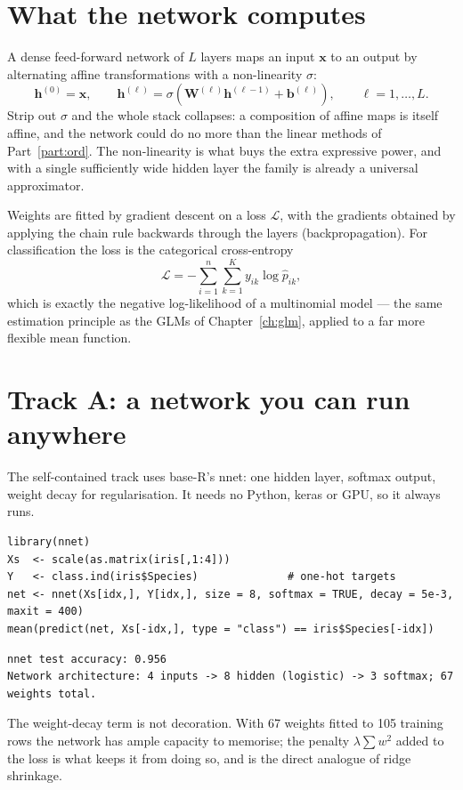 \documentclass[11pt,oneside]{book}
\newcommand{\R}{\textsf{R}}
\newcommand{\pkg}[1]{\textsf{#1}}
\begin{document}
\section{What the network computes}
A dense feed-forward network of $L$ layers maps an input $\mathbf{x}$ to an output by
alternating affine transformations with a non-linearity $\sigma$:
\[
  \mathbf{h}^{(0)}=\mathbf{x},\qquad
  \mathbf{h}^{(\ell)}=\sigma\!\left(\mathbf{W}^{(\ell)}\mathbf{h}^{(\ell-1)}+\mathbf{b}^{(\ell)}\right),
  \qquad \ell=1,\dots,L .
\]
Strip out $\sigma$ and the whole stack collapses: a composition of affine maps is itself
affine, and the network could do no more than the linear methods of Part~\ref{part:ord}. The
non-linearity is what buys the extra expressive power, and with a single sufficiently wide
hidden layer the family is already a universal approximator.

Weights are fitted by gradient descent on a loss $\mathcal{L}$, with the gradients obtained
by applying the chain rule backwards through the layers (backpropagation). For
classification the loss is the categorical cross-entropy
\[
  \mathcal{L}=-\sum_{i=1}^{n}\sum_{k=1}^{K} y_{ik}\log \hat{p}_{ik},
\]
which is exactly the negative log-likelihood of a multinomial model — the same estimation
principle as the GLMs of Chapter~\ref{ch:glm}, applied to a far more flexible mean function.

\section{Track A: a network you can run anywhere}
The self-contained track uses base-\R's \pkg{nnet}: one hidden layer, softmax output,
weight decay for regularisation. It needs no Python, keras or GPU, so it always runs.

\begin{lstlisting}
library(nnet)
Xs  <- scale(as.matrix(iris[,1:4]))
Y   <- class.ind(iris$Species)              # one-hot targets
net <- nnet(Xs[idx,], Y[idx,], size = 8, softmax = TRUE, decay = 5e-3, maxit = 400)
mean(predict(net, Xs[-idx,], type = "class") == iris$Species[-idx])
\end{lstlisting}

\begin{lstlisting}[style=rout]
nnet test accuracy: 0.956
Network architecture: 4 inputs -> 8 hidden (logistic) -> 3 softmax; 67 weights total.
\end{lstlisting}

The weight-decay term is not decoration. With 67 weights fitted to 105 training rows the
network has ample capacity to memorise; the penalty $\lambda\sum w^2$ added to the loss is
what keeps it from doing so, and is the direct analogue of ridge shrinkage.
\end{document}
